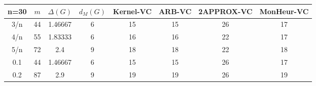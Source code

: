 \begin{tabular}{||c||ccc||cccc||}
 \hline \hline 
 n=30&$m$&$\Delta (G)$&$d_M(G)$& Kernel-VC & ARB-VC & 2APPROX-VC & MonHeur-VC\\ \hline \hline
3/n&44&1.46667&6&15&15&26&17\\
4/n&55&1.83333&6&16&16&22&17\\
5/n&72&2.4&9&18&18&22&18\\
0.1&44&1.46667&6&15&15&26&17\\
0.2&87&2.9&9&19&19&26&19\\
\hline \end{tabular}

